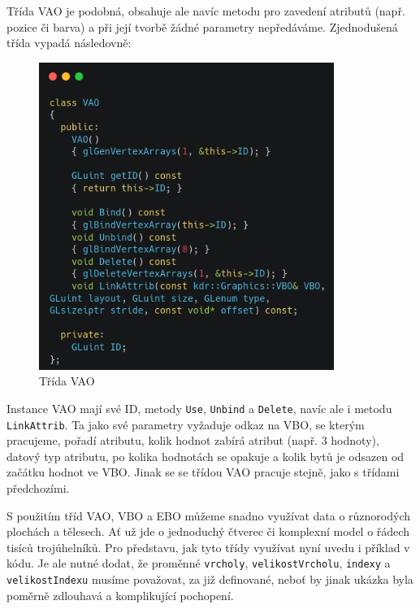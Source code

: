 \documentclass[12pt]{article}
\begin{document}
Třída VAO je podobná, obsahuje ale navíc metodu pro zavedení atributů (např. pozice či barva) a při její tvorbě žádné parametry nepředáváme. Zjednodušená třída vypadá následovně:

\vspace{0.5cm}
\begin{figure}[h]
    \centering
    \includegraphics[height=10cm]{images/vao.png}
    \caption{Třída VAO}
    \label{fig:Třídy VAO}
\end{figure}

\pagebreak

Instance VAO mají své ID, metody \texttt{Use}, \texttt{Unbind} a \texttt{Delete}, navíc ale i metodu \texttt{LinkAttrib}. Ta jako své parametry vyžaduje odkaz na VBO, se kterým pracujeme, pořadí atributu, kolik hodnot zabírá atribut (např. 3 hodnoty), datový typ atributu, po kolika hodnotách se opakuje a kolik bytů je odsazen od začátku hodnot ve VBO. Jinak se se třídou VAO pracuje stejně, jako s třídami předchozími.

S použitím tříd VAO, VBO a EBO můžeme snadno využívat data o různorodých plochách a tělesech. Ať už jde o jednoduchý čtverec či komplexní model o řádech tisíců trojúhelníků. Pro představu, jak tyto třídy využívat nyní uvedu i příklad v kódu. Je ale nutné dodat, že proměnné \texttt{vrcholy}, \texttt{velikostVrcholu}, \texttt{indexy} a \texttt{velikostIndexu} musíme považovat, za již definované, neboť by jinak ukázka byla poměrně zdlouhavá a komplikující pochopení.
\end{document}
